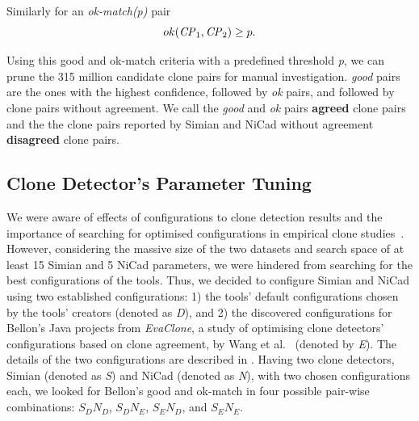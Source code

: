 \documentclass[sigconf,review, anonymous]{acmart}
\newcommand{\squeezeup}{\vspace{-0.5mm}}
\begin{document}
Similarly for an \textit{ok-match(p)} pair
\begin{equation}
ok(\textrm{\textit{CP}}_1,\textrm{\textit{CP}}_2) \geq p.
\end{equation}

Using this good and ok-match criteria with a predefined threshold \textit{p}, we can prune the 315 million candidate clone pairs for manual investigation. \textit{good} pairs are the ones with the highest confidence, followed by \textit{ok} pairs, and followed by clone pairs without agreement. We call the 
\textit{good} and \textit{ok} pairs \textbf{agreed} clone pairs and the the clone pairs reported by Simian and NiCad without agreement \textbf{disagreed} clone pairs.

\subsection{Clone Detector's Parameter Tuning}
We were aware of effects of configurations to clone detection results and the importance of searching for optimised configurations in empirical clone studies~\cite{Wang2014,cr2016ssbse,Ragkhitwetsagul2016,Svajlenko2014}. However, considering the massive size of the two datasets and search space of at least 15 Simian and 5 NiCad parameters, we were hindered from searching for the best configurations of the tools. Thus, we decided to configure Simian and NiCad using two established configurations: 1) the tools' default configurations chosen by the tools' creators (denoted as \textit{D}), and 2) the discovered configurations for Bellon's Java projects from \textit{EvaClone}, a study of optimising clone detectors' configurations based on clone agreement, by Wang et al.~\cite{Wang2013} (denoted by \textit{E}). The details of the two configurations are described in . Having two clone detectors, Simian (denoted as \textit{S}) and NiCad (denoted as \textit{N}), with two chosen configurations each, we looked for Bellon's good and ok-match in four possible pair-wise combinations: $S_{D}N_{D}$, $S_{D}N_{E}$, $S_{E}N_{D}$, and $S_{E}N_{E}$.
\end{document}
